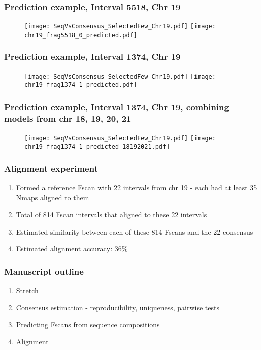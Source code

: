 \documentclass[10pt,dvipsnames,table]{beamer}
\begin{document}
\begin{frame}
\frametitle{Prediction example, Interval 5518, Chr 19}
\begin{figure}
\texttt{[image: SeqVsConsensus\_SelectedFew\_Chr19.pdf]}
\pause
\texttt{[image: chr19\_frag5518\_0\_predicted.pdf]}
\end{figure}
\end{frame}

\begin{frame}
\frametitle{Prediction example, Interval 1374, Chr 19}
\begin{figure}
\texttt{[image: SeqVsConsensus\_SelectedFew\_Chr19.pdf]}
\pause
\texttt{[image: chr19\_frag1374\_1\_predicted.pdf]}
\end{figure}
\end{frame}

\begin{frame}
\frametitle{Prediction example, Interval 1374, Chr 19, combining models from chr 18, 19, 20, 21}
\begin{figure}
\texttt{[image: SeqVsConsensus\_SelectedFew\_Chr19.pdf]}
\texttt{[image: chr19\_frag1374\_1\_predicted\_18192021.pdf]}
\end{figure}
\end{frame}

\begin{frame}
\frametitle{Alignment experiment}
\begin{enumerate}
\item Formed a reference Fscan with 22 intervals from chr 19 - each had at least 35 Nmaps aligned to them
\item Total of 814 Fscan intervals that aligned to these 22 intervals
\item Estimated similarity between each of these 814 Fscans and the 22 consensus
\item Estimated alignment accuracy: 36\%
\end{enumerate}

\end{frame}

\begin{frame}
\frametitle{Manuscript outline}
\begin{enumerate}
\item Stretch
\vspace{0.5cm}
\item Consensus estimation - reproducibility, uniqueness, pairwise tests
\vspace{0.5cm}
\item Predicting Fscans from sequence compositions
\vspace{0.5cm}
\item Alignment
\end{enumerate}

\end{frame}
\end{document}
